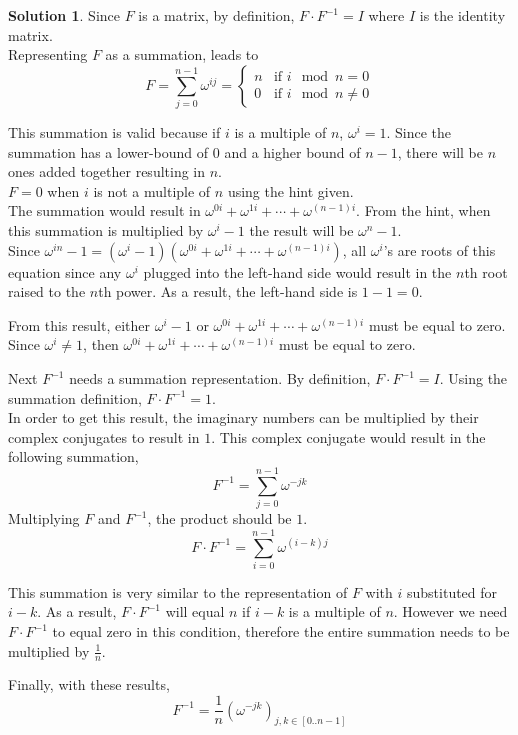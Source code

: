 \documentclass{article}
\theoremstyle{definition}
\newtheorem*{solution}{Solution}
\begin{document}
\begin{solution}
Since $F$ is a matrix, by definition, $F\cdot F^{-1}=I$ where $I$ is the identity matrix.\\
Representing $F$ as a summation, leads to
\[F=\sum_{j=0}^{n-1}\omega^{ij}=\begin{cases}
n & \text{if $i\mod{n}=0$} \\
0 & \text{if $i\mod{n}\neq0$}
\end{cases}\]

\noindent
This summation is valid because if $i$ is a multiple of $n$, $\omega^i=1$. Since the summation has a lower-bound of $0$ and a higher bound of $n-1$, there will be $n$ ones added together resulting in $n$.\\
$F=0$ when $i$ is not a multiple of $n$ using the hint given.\\
The summation would result in $\omega^{0i}+\omega^{1i}+\cdots+\omega^{(n-1)i}$. From the hint, when this summation is multiplied by $\omega^i-1$ the result will be $\omega^n-1$.\\
Since $\omega^{in}-1=(\omega^i-1)\left(\omega^{0i}+\omega^{1i}+\cdots+\omega^{(n-1)i}\right)$, all $\omega^i$'s are roots of this equation since any $\omega^i$ plugged into the left-hand side would result in the $n$th root raised to the $n$th power. As a result, the left-hand side is $1-1=0$.

\noindent
From this result, either $\omega^i-1$ or $\omega^{0i}+\omega^{1i}+\cdots+\omega^{(n-1)i}$ must be equal to zero.\\
Since $\omega^i\neq1$, then $\omega^{0i}+\omega^{1i}+\cdots+\omega^{(n-1)i}$ must be equal to zero.

\noindent
Next $F^{-1}$ needs a summation representation. By definition, $F\cdot F^{-1}=I$. Using the summation definition, $F\cdot F^{-1}=1$.\\
In order to get this result, the imaginary numbers can be multiplied by their complex conjugates to result in $1$.
This complex conjugate would result in the following summation,
\[F^{-1}=\sum_{j=0}^{n-1}\omega^{-jk}\]
Multiplying $F$ and $F^{-1}$, the product should be $1$.
\[F\cdot F^{-1}=\sum_{i=0}^{n-1}\omega^{(i-k)j}\]

\noindent
This summation is very similar to the representation of $F$ with $i$ substituted for $i-k$. 
As a result, $F\cdot F^{-1}$ will equal $n$ if $i-k$ is a multiple of $n$. However we need $F\cdot F^{-1}$ to equal zero in this condition, therefore the entire summation needs to be multiplied by $\displaystyle\frac{1}{n}$.

\noindent
Finally, with these results,
\[F^{-1}=\frac{1}{n}\left(\omega^{-jk}\right)_{j,k\in[0..n-1]}\]

\end{solution}
\end{document}
